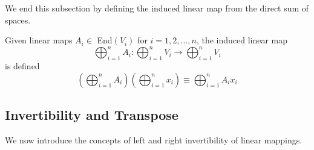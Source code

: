 \documentclass{article}
\begin{document}
    We end this subsection by defining the induced linear map from the direct sum of spaces. 

    \begin{definition}
      Given linear maps $A_i \in$ End$(V_i)$ for $i = 1, 2, ..., n$, the induced linear map
      \begin{equation}
        \bigoplus_{i =1}^n A_i: \bigoplus_{i=1}^n V_i \longrightarrow \bigoplus_{i=1}^n V_i
      \end{equation}
      is defined
      \begin{equation}
        (\bigoplus_{i=1}^n A_i)(\bigoplus_{i=1}^n x_i) \equiv \bigoplus_{i=1}^n A_i x_i
      \end{equation}
    \end{definition}

  \subsection{Invertibility and Transpose}

    We now introduce the concepts of left and right invertibility of linear mappings. 
\end{document}
